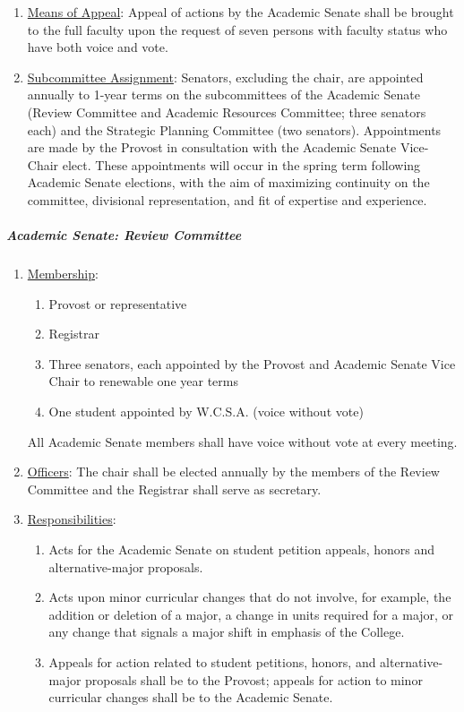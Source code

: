\begin{enumerate}[label=\alph*)]
{\begin{enumerate}[label=\arabic*)]
							\end{enumerate}
						}
						\item{\underline{Means of Appeal}:  Appeal of actions by the Academic Senate shall be brought to the full faculty upon the request of seven persons with faculty status who have both voice and vote.}
						\item{\underline{Subcommittee Assignment}:  Senators, excluding the chair, are appointed annually to 1-year terms on the subcommittees of the Academic Senate (Review Committee and Academic Resources Committee; three senators each) and the Strategic Planning Committee (two senators).  Appointments are made by the Provost in consultation with the Academic Senate Vice-Chair elect.  These appointments will occur in the spring term following Academic Senate elections, with the aim of maximizing continuity on the committee, divisional representation, and fit of expertise and experience.}
					\end{enumerate}
				\subparagraph{Academic Senate:  Review Committee}
					\begin{enumerate}[label=\alph*)]
						\item{\underline{Membership}:
							\begin{enumerate}[label=\arabic*)]
								\item{Provost or representative}
								\item{Registrar}
								\item{Three senators, each appointed by the Provost and Academic Senate Vice Chair to renewable one year terms}
								\item{One student appointed by W.C.S.A. (voice without vote)}
							\end{enumerate}
							All Academic Senate members shall have voice without vote at every meeting.
						}
						\item{\underline{Officers}:
							The chair shall be elected annually by the members of the Review Committee and the Registrar shall serve as secretary.
						}
						\item{\underline{Responsibilities}:
							\begin{enumerate}[label=\arabic*)]
								\item{Acts for the Academic Senate on student petition appeals, honors and alternative-major proposals.}
								\item{Acts upon minor curricular changes that do not involve, for example, the addition or deletion of a major, a change in units required for a major, or any change that signals a major shift in emphasis of the College.}
								\item{Appeals for action related to student petitions, honors, and alternative-major proposals shall be to the Provost; appeals for action to minor curricular changes shall be to the Academic Senate.}
							\end{enumerate}
						}
					\end{enumerate}
